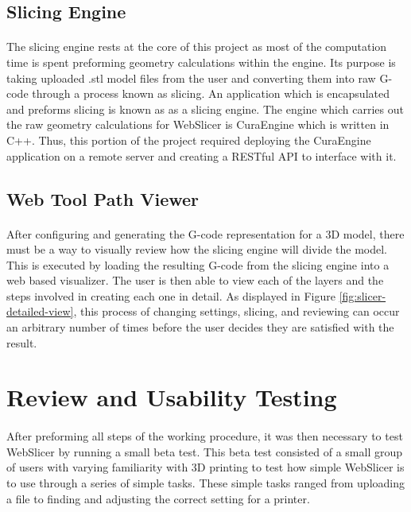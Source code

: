 \subsection{Slicing Engine}
\paragraph{}
The slicing engine rests at the core of this project as most of the computation time is spent preforming geometry calculations within the engine.
Its purpose is taking uploaded .stl model files from the user and converting them into raw G-code through a process known as slicing.
An application which is encapsulated and preforms slicing is known as as a slicing engine.
The engine which carries out the raw geometry calculations for WebSlicer is CuraEngine which is written in C++.
Thus, this portion of the project required deploying the CuraEngine application on a remote server and creating a RESTful API to interface with it.

\subsection{Web Tool Path Viewer}
\paragraph{}
After configuring and generating the G-code representation for a 3D model, there must be a way to visually review how the slicing engine will divide the model.
This is executed by loading the resulting G-code from the slicing engine into a web based visualizer.
The user is then able to view each of the layers and the steps involved in creating each one in detail.
As displayed in Figure \ref{fig:slicer-detailed-view}, this process of changing settings, slicing, and reviewing can occur an arbitrary number of times before the user decides they are satisfied with the result.

\section{Review and Usability Testing}
\paragraph{}
After preforming all steps of the working procedure, it was then necessary to test WebSlicer by running a small beta test. 
This beta test consisted of a small group of users with varying familiarity with 3D printing to test how simple WebSlicer is to use through a series of simple tasks.
These simple tasks ranged from uploading a file to finding and adjusting the correct setting for a printer.
